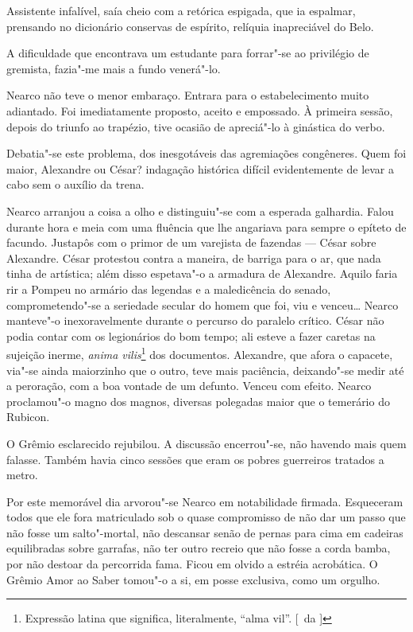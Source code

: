 Assistente infalível, saía cheio com a retórica espigada, que ia
espalmar, prensando no dicionário conservas de espírito, relíquia
inapreciável do Belo. 

A dificuldade que encontrava um estudante para
forrar"-se ao privilégio de gremista, fazia"-me mais a fundo
venerá"-lo. 

Nearco não teve o menor embaraço. Entrara para o
estabelecimento muito adiantado. Foi imediatamente proposto, aceito e
empossado. À primeira sessão, depois do triunfo ao trapézio, tive
ocasião de apreciá"-lo à ginástica do verbo. 

Debatia"-se este
problema, dos inesgotáveis das agremiações congêneres. Quem foi maior,
Alexandre ou César? indagação histórica difícil evidentemente de levar
a cabo sem o auxílio da trena. 

Nearco arranjou a coisa a olho e
distinguiu"-se com a esperada galhardia. Falou durante hora e meia com
uma fluência que lhe angariava para sempre o epíteto de facundo.
Justapôs com o primor de um varejista de fazendas --- César sobre
Alexandre. César protestou contra a maneira, de barriga para o ar, que
nada tinha de artística; além disso espetava"-o a armadura de
Alexandre. Aquilo faria rir a Pompeu no armário das legendas e a
maledicência do senado, comprometendo"-se a seriedade secular do homem
que foi, viu e venceu\ldots{} Nearco manteve"-o inexoravelmente durante o
percurso do paralelo crítico. César não podia contar com os legionários
do bom tempo; ali esteve a fazer caretas na sujeição inerme, \textit{anima
vilis}\footnote{ Expressão latina que significa, literalmente, ``alma vil''. 
[~da ]} dos documentos. 
Alexandre, que afora o capacete, via"-se ainda
maiorzinho que o outro, teve mais paciência, deixando"-se medir até a
peroração, com a boa vontade de um defunto. Venceu com efeito. Nearco
proclamou"-o magno dos magnos, diversas polegadas maior que o
temerário do Rubicon. 

O Grêmio esclarecido rejubilou. A discussão
encerrou"-se, não havendo mais quem falasse. Também havia cinco
sessões que eram os pobres guerreiros tratados a metro. 

Por este memorável dia arvorou"-se Nearco em notabilidade firmada. Esqueceram
todos que ele fora matriculado sob o quase compromisso de não dar um
passo que não fosse um salto"-mortal, não descansar senão de pernas
para cima em cadeiras equilibradas sobre garrafas, não ter outro
recreio que não fosse a corda bamba, por não destoar da percorrida
fama. Ficou em olvido a estréia acrobática. O Grêmio Amor ao Saber
tomou"-o a si, em posse exclusiva, como um orgulho. 

